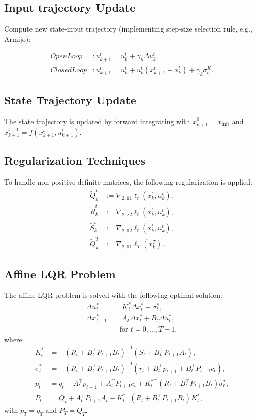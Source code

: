 \documentclass[a4paper,11pt,oneside]{book}
\begin{document}
\subsection{Input trajectory Update}

Compute new state-input trajectory (implementing step-size selection rule, e.g., Armijo):

\begin{align}
OpenLoop &: u_{k+1}^t = u_k^t + \gamma_k \Delta u_k^t. \\
ClosedLoop &: u_{k+1}^t = u_k^t + u_k^t(x_{k+1}^t -x_k^t) + \gamma_k \sigma_t^K.   
\end{align}


\subsection{State Trajectory Update}
The state trajectory is updated by forward integrating with \( x_{k+1}^0 = x_{\text{init}} \) and \( x_{k+1}^{t+1} = f(x_{k+1}^t, u_{k+1}^t) \).

\subsection{Regularization Techniques}
To handle non-positive definite matrices, the following regularization is applied:
\begin{align*}
\tilde{Q}_k^t &:= \nabla_{2,11} \ell_t(x_k^t, u_k^t), \\
\tilde{R}_k^t &:= \nabla_{2,22} \ell_t(x_k^t, u_k^t), \\
\tilde{S}_k^t &:= \nabla_{2,12} \ell_t(x_k^t, u_k^t), \\
\tilde{Q}_k^T &:= \nabla_{2,11} \ell_T(x_k^T).
\end{align*}

\subsection{Affine LQR Problem}
The affine LQR problem is solved with the following optimal solution:
\begin{align}
    \Delta u_t^* &= K_t^* \Delta x_t^* + \sigma_t^*, \\
    \Delta x_{t+1}^* &= A_t \Delta x_t^* + B_t \Delta u_t^*, \\
    &\quad \text{for } t = 0, \ldots, T-1, \nonumber
\end{align}
where
\begin{align*}
    K_t^* &= -(R_t + B_t^{\top} P_{t+1} B_t)^{-1}(S_t + B_t^{\top} P_{t+1} A_t), \\
    \sigma_t^* &= -(R_t + B_t^{\top} P_{t+1} B_t)^{-1}\left( r_t + B_t^{\top} p_{t+1} + B_t^{\top} P_{t+1} c_t \right), \\
    p_t &= q_t + A_t^{\top} p_{t+1} + A_t^{\top} P_{t+1} c_t + K_t^{* \top} \left( R_t + B_t^{\top} P_{t+1} B_t \right) \sigma_t^*, \\
    P_t &= Q_t + A_t^{\top} P_{t+1} A_t - K_t^{* \top} (R_t + B_t^{\top} P_{t+1} B_t) K_t^*,
\end{align*}
with \( p_T = q_T \) and \( P_T = Q_T \).
\end{document}
